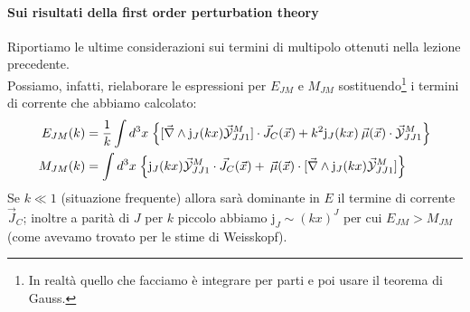 \paragraph{Sui risultati della first order perturbation theory} Riportiamo le ultime considerazioni sui termini di multipolo ottenuti nella lezione precedente.\\
Possiamo, infatti, rielaborare le espressioni per $E_{JM}$ e $M_{JM}$ sostituendo\footnote{In realtà quello che facciamo è integrare per parti e poi usare il teorema di Gauss.} i termini di corrente che abbiamo calcolato:
\begin{displaymath}
\begin{aligned}
E_{JM}(k) &= \frac{1}{k} \int d^3x \; \Bigl \{ [\vec{\nabla}\land \mathrm{j}_J(kx) \vec{\mathcal{Y}}^M_{JJ1}] \cdot \vec{J}_C(\vec{x}) + k^2 \mathrm{j}_J(kx) \:\vec{\mu}(\vec{x})\cdot\vec{\mathcal{Y}}^M_{JJ1} \Bigr \} \\
M_{JM}(k) &=  \int d^3x \; \Bigl \{ \mathrm{j}_J(kx) \vec{\mathcal{Y}}^M_{JJ1}\cdot \vec{J}_C(\vec{x}) + \:\vec{\mu}(\vec{x})\cdot[\vec{\nabla}\land \mathrm{j}_J(kx) \vec{\mathcal{Y}}^M_{JJ1}] \Bigr \}
\end{aligned}
\end{displaymath}
Se $k\ll 1$ (situazione frequente) allora sarà dominante in $E$ il termine di corrente $\vec{J}_C$; inoltre a parità di $J$ per $k$ piccolo abbiamo $\mathrm{j}_J\sim (kx)^J$ per cui $E_{JM}>M_{JM}$ (come avevamo trovato per le stime di Weisskopf).

